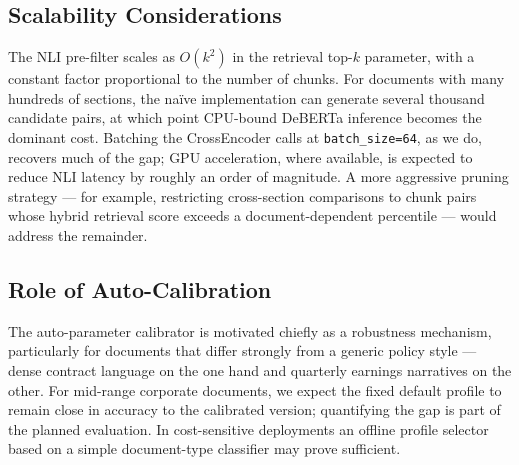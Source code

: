 \documentclass[conference]{IEEEtran}
\begin{document}
\subsection{Scalability Considerations}
The NLI pre-filter scales as $O(k^2)$ in the retrieval top-$k$ parameter, with a constant factor proportional to the number of chunks. For documents with many hundreds of sections, the na\"{i}ve implementation can generate several thousand candidate pairs, at which point CPU-bound DeBERTa inference becomes the dominant cost. Batching the CrossEncoder calls at \texttt{batch\_size=64}, as we do, recovers much of the gap; GPU acceleration, where available, is expected to reduce NLI latency by roughly an order of magnitude. A more aggressive pruning strategy --- for example, restricting cross-section comparisons to chunk pairs whose hybrid retrieval score exceeds a document-dependent percentile --- would address the remainder.
\subsection{Role of Auto-Calibration}
The auto-parameter calibrator is motivated chiefly as a robustness mechanism, particularly for documents that differ strongly from a generic policy style --- dense contract language on the one hand and quarterly earnings narratives on the other. For mid-range corporate documents, we expect the fixed default profile to remain close in accuracy to the calibrated version; quantifying the gap is part of the planned evaluation. In cost-sensitive deployments an offline profile selector based on a simple document-type classifier may prove sufficient.
\end{document}
